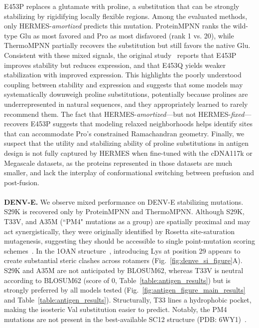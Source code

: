 E453P replaces a glutamate with proline, a substitution that can be strongly stabilizing by
rigidifying locally flexible regions. Among the evaluated methods, only HERMES-\textit{amortized}
predicts this mutation. ProteinMPNN ranks the wild-type Glu as most favored and Pro as most
disfavored (rank 1 vs. 20), while ThermoMPNN partially recovers the substitution but still favors
the native Glu. Consistent with these mixed signals, the original
study~\citep{bakkers_efficacious_2024} reports that E453P improves stability but reduces expression,
and that E453Q yields weaker stabilization with improved expression. This highlights the poorly
understood coupling between stability and expression and suggests that some models may
systematically downweigh proline substitutions, potentially because prolines are underrepresented in
natural sequences, and they appropriately learned to rarely recommend them.
The fact that HERMES-\textit{amortized}—but not HERMES-\textit{fixed}—recovers E453P suggests that
modeling relaxed neighborhoods helps identify sites that can accommodate Pro's constrained
Ramachandran geometry. Finally, we suspect that the utility and stabilizing ability of proline
substitutions in antigen design is not fully captured by HERMES when fine-tuned with the cDNA117k or
Megascale datasets, as the proteins represented in those datasets are much smaller, and lack the
interplay of conformational switching between prefusion and post-fusion.\\\\
\textbf{DENV-E.} 
We observe mixed performance on DENV-E stabilizing mutations. S29K is recovered only by ProteinMPNN
and ThermoMPNN. Although S29K, T33V, and A35M (``PM4" mutations as a group) are spatially proximal
and may act synergistically, they were originally identified by Rosetta site-saturation mutagenesis,
suggesting they should be accessible to single point-mutation scoring
schemes~\citep{phan_conserved_2022}. In the 1OAN structure~\citep{modis_ligand-binding_2003},
introducing Lys at position 29 appears to create substantial steric clashes across rotamers
(Fig.~\ref{fig:denve_si_figure}A). S29K and A35M are not anticipated by BLOSUM62, whereas T33V is
neutral according to BLOSUM62 (score of $0$, Table~\ref{table:antigen_results}) but is strongly
preferred by all models tested (Fig.~\ref{fig:antigen_figure_main_results} and
Table~\ref{table:antigen_results}). Structurally, T33 lines a hydrophobic pocket, making the
isosteric Val substitution easier to predict. Notably, the PM4 mutations are not present in the
best-available SC12 structure (PDB: 6WY1)~\citep{kudlacek_designed_2021}.


